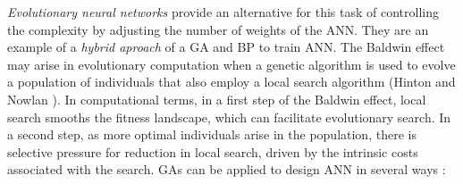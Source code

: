 \documentclass{elsart}
\begin{document}
\emph{Evolutionary neural networks} provide an alternative for this task of controlling the complexity by adjusting the number of weights of the ANN. They are an example of a \emph{hybrid aproach} of a GA and BP to train ANN. 
The Baldwin effect may arise in evolutionary computation when a genetic algorithm is used to evolve a population of individuals that also employ a local search algorithm (Hinton and Nowlan \cite{Hinton}). In computational terms, in a first step of the Baldwin effect, local search smooths the fitness landscape, which can facilitate evolutionary search. In a second step, as more optimal individuals arise in the population, there is selective pressure for reduction in local search, driven by the intrinsic costs associated with the search.
GAs can be applied to design ANN in several ways \cite{Yao92,Marin95}:
\end{document}
